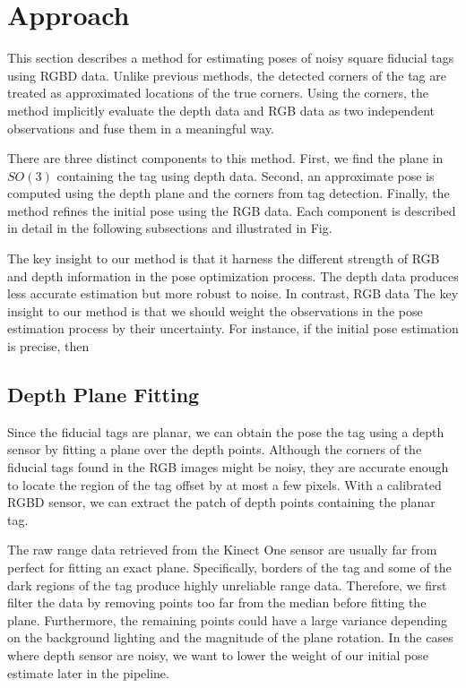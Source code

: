 \section{Approach}
\label{sec:approach}
This section describes a method for estimating poses of noisy square fiducial tags using RGBD data. Unlike previous methods, the detected corners of the tag are treated as approximated locations of the true corners. Using the corners, the method implicitly evaluate the depth data and RGB data as two independent observations and fuse them in a meaningful way.

There are three distinct components to this method. First, we find the plane in $SO(3)$ containing the tag using depth data. Second, an approximate pose is computed using the depth plane and the corners from tag detection. Finally, the method refines the initial pose using the RGB data. Each component is described in detail in the following subsections and illustrated in Fig. 


The key insight to our method is that it harness the different strength of RGB and depth information in the pose optimization process. The depth data produces less accurate estimation but more robust to noise. In contrast, RGB data 
The key insight to our method is that we should weight the observations in the pose estimation process by their uncertainty. For instance, if the initial pose estimation is precise, then 

\subsection{Depth Plane Fitting}
Since the fiducial tags are planar, we can obtain the pose the tag using a depth sensor by fitting a plane over the depth points. Although the corners of the fiducial tags found in the RGB images might be noisy, they are accurate enough to locate the region of the tag offset by at most a few pixels. With a calibrated RGBD sensor, we can extract the patch of depth points containing the planar tag. 

The raw range data retrieved from the Kinect One sensor are usually far from perfect for fitting an exact plane. Specifically, borders of the tag and some of the dark regions of the tag produce highly unreliable range data. Therefore, we first filter the data by removing points too far from the median before fitting the plane. Furthermore, the remaining points could have a large variance depending on the background lighting and the magnitude of the plane rotation. In the cases where depth sensor are noisy, we want to lower the weight of our initial pose estimate later in the pipeline. 

